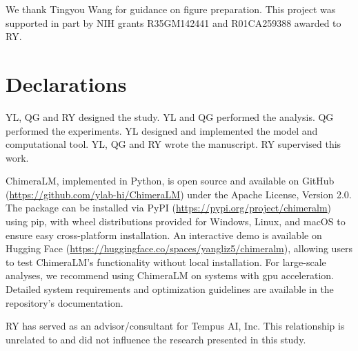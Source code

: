 \documentclass[pdflatex,sn-nature,lineno]{sn-jnl}%
\theoremstyle{thmstyleone}%
\theoremstyle{thmstyletwo}%
\theoremstyle{thmstylethree}%
\begin{document}

We thank Tingyou Wang for guidance on figure preparation.
This project was supported in part by NIH grants R35GM142441 and R01CA259388 awarded to RY.

\section*{Declarations}


YL, QG and RY designed the study.
YL and QG performed the analysis.
QG performed the experiments.
YL designed and implemented the model and computational tool.
YL, QG and RY wrote the manuscript.
RY supervised this work.



ChimeraLM, implemented in Python, is open source and available on GitHub (\url{https://github.com/ylab-hi/ChimeraLM}) under the Apache License, Version 2.0.
The package can be installed via PyPI (\url{https://pypi.org/project/chimeralm}) using pip, with wheel distributions provided for Windows, Linux, and macOS to ensure easy cross-platform installation.
An interactive demo is available on Hugging Face (\url{https://huggingface.co/spaces/yangliz5/chimeralm}), allowing users to test ChimeraLM's functionality without local installation.
For large-scale analyses, we recommend using ChimeraLM on systems with \gls{gpu} acceleration. Detailed system requirements and optimization guidelines are available in the repository's documentation.


RY has served as an advisor/consultant for Tempus AI, Inc. This relationship is unrelated to and did not influence the research presented in this study.


%
\end{document}
